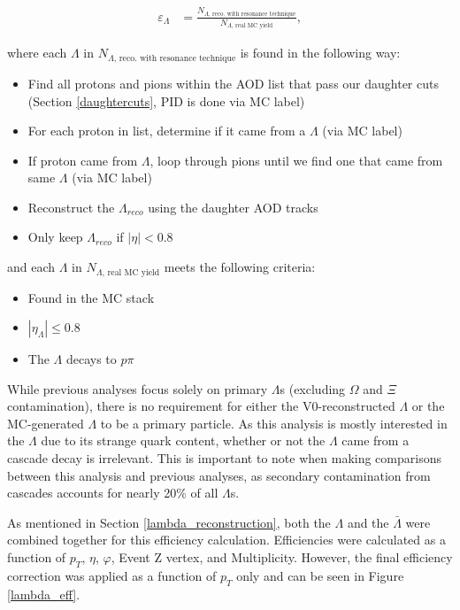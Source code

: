 \documentclass[ALICE,manyauthors]{ALICE_analysis_notes}
\begin{document}
\begin{align*}
	\varepsilon_{\Lambda} &=  \frac{N_{\Lambda\text{, reco. with resonance technique}}}{N_{\Lambda\text{, real MC yield}}},
\end{align*}

where each $\Lambda$ in $N_{\Lambda\text{, reco. with resonance technique}}$ is found in the following way:

\begin{itemize}
	\item Find all protons and pions within the AOD list that pass our daughter cuts (Section \ref{daughtercuts}, PID is done via MC label)
	\item For each proton in list, determine if it came from a $\Lambda$ (via MC label)
	\item If proton came from $\Lambda$, loop through pions until we find one that came from same $\Lambda$ (via MC label)
	\item Reconstruct the $\Lambda_{reco}$ using the daughter AOD tracks
	\item Only keep $\Lambda_{reco}$ if $|\eta| < 0.8$
\end{itemize}

and each $\Lambda$ in $N_{\Lambda\text{, real MC yield}}$ meets the following criteria:

\begin{itemize}
	\item Found in the MC stack
	\item $|\eta_{\Lambda}| \leq 0.8$
	\item The $\Lambda$ decays to $p\pi$
\end{itemize}

While previous analyses focus solely on primary $\Lambda$s (excluding $\Omega$ and $\Xi$ contamination), there is no requirement for either the V0-reconstructed $\Lambda$ or the MC-generated $\Lambda$ to be a primary particle. As this analysis is mostly interested in the $\Lambda$ due to its strange quark content, whether or not the $\Lambda$ came from a cascade decay is irrelevant. This is important to note when making comparisons between this analysis and previous analyses, as secondary contamination from cascades accounts for nearly 20\% of all $\Lambda$s.

As mentioned in Section \ref{lambda_reconstruction}, both the $\Lambda$ and the $\bar{\Lambda}$ were combined together for this efficiency calculation. Efficiencies were calculated as a function of $p_T$, $\eta$, $\varphi$, Event Z vertex, and Multiplicity. However, the final efficiency correction was applied as a function of $p_T$ only and can be seen in Figure \ref{lambda_eff}.
\end{document}
